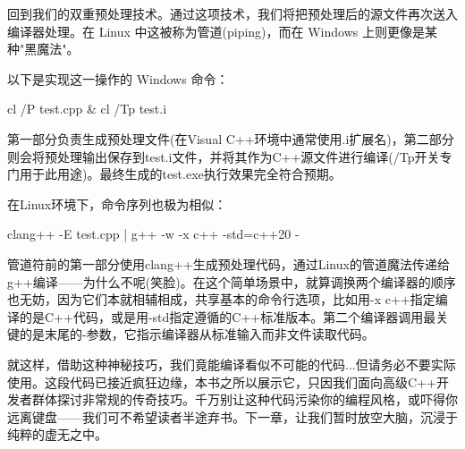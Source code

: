 回到我们的双重预处理技术。通过这项技术，我们将把预处理后的源文件再次送入编译器处理。在 Linux 中这被称为管道(piping)，而在 Windows 上则更像是某种"黑魔法"。

以下是实现这一操作的 Windows 命令：

\begin{shell}
cl /P test.cpp & cl /Tp test.i
\end{shell}

第一部分负责生成预处理文件(在Visual C++环境中通常使用.i扩展名)，第二部分则会将预处理输出保存到test.i文件，并将其作为C++源文件进行编译(/Tp开关专门用于此用途)。最终生成的test.exe执行效果完全符合预期。

在Linux环境下，命令序列也极为相似：

\begin{shell}
clang++ -E test.cpp | g++ -w -x c++ -std=c++20 -
\end{shell}

管道符前的第一部分使用clang++生成预处理代码，通过Linux的管道魔法传递给g++编译——为什么不呢(笑脸)。在这个简单场景中，就算调换两个编译器的顺序也无妨，因为它们本就相辅相成，共享基本的命令行选项，比如用-x c++指定编译的是C++代码，或是用-std指定遵循的C++标准版本。第二个编译器调用最关键的是末尾的-参数，它指示编译器从标准输入而非文件读取代码。

就这样，借助这种神秘技巧，我们竟能编译看似不可能的代码...但请务必不要实际使用。这段代码已接近疯狂边缘，本书之所以展示它，只因我们面向高级C++开发者群体探讨非常规的传奇技巧。千万别让这种代码污染你的编程风格，或吓得你远离键盘——我们可不希望读者半途弃书。下一章，让我们暂时放空大脑，沉浸于纯粹的虚无之中。














